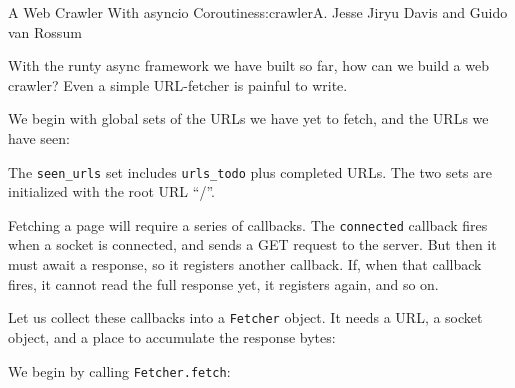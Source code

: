 \begin{aosachapter}{A Web Crawler With asyncio Coroutines}{s:crawler}{A. Jesse Jiryu Davis and Guido van Rossum}
\label{programming-with-callbacks}

With the runty async framework we have built so far, how can we build a
web crawler? Even a simple URL-fetcher is painful to write.

We begin with global sets of the URLs we have yet to fetch, and the URLs
we have seen:

\begin{Shaded}
\begin{Highlighting}[]
\NormalTok{([}\NormalTok{])}
\NormalTok{([}\NormalTok{])}
\end{Highlighting}
\end{Shaded}

The \texttt{seen\_urls} set includes \texttt{urls\_todo} plus completed
URLs. The two sets are initialized with the root URL ``/''.

Fetching a page will require a series of callbacks. The
\texttt{connected} callback fires when a socket is connected, and sends
a GET request to the server. But then it must await a response, so it
registers another callback. If, when that callback fires, it cannot read
the full response yet, it registers again, and so on.

Let us collect these callbacks into a \texttt{Fetcher} object. It needs
a URL, a socket object, and a place to accumulate the response bytes:

\begin{Shaded}
\begin{Highlighting}[]
 
     \NormalTok{(}
          
\end{Highlighting}
\end{Shaded}

We begin by calling \texttt{Fetcher.fetch}:

\begin{Shaded}
\begin{Highlighting}[]
     \NormalTok{):}
        \NormalTok{)}
        \NormalTok{:}
            \NormalTok{((}\NormalTok{, }\NormalTok{))}
         \NormalTok{:}
            

\end{Highlighting}
\end{Shaded}
\end{aosachapter}
